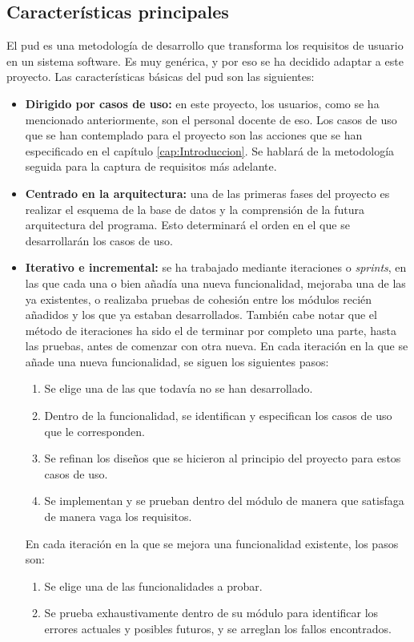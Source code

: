 \subsection{Características principales}
El \gls{pud} es una metodología de desarrollo que transforma los requisitos de usuario en un sistema software. Es muy genérica, y por eso se ha decidido adaptar a este proyecto.
Las características básicas del \gls{pud} son las siguientes:
\begin{itemize}
	\item \textbf{Dirigido por casos de uso:} en este proyecto, los usuarios, como se ha mencionado anteriormente, son el personal docente de \gls{eso}. Los casos de uso que se han contemplado para el proyecto son las acciones que se han especificado en el capítulo \ref{cap:Introduccion}. Se hablará de la metodología seguida para la captura de requisitos más adelante.
	\item \textbf{Centrado en la arquitectura:} una de las primeras fases del proyecto es realizar el esquema de la base de datos y la comprensión de la futura arquitectura del programa. Esto determinará el orden en el que se desarrollarán los casos de uso.
	\item \textbf{Iterativo e incremental:} se ha trabajado mediante iteraciones o \textit{sprints}, en las que cada una o bien añadía una nueva funcionalidad, mejoraba una de las ya existentes, o realizaba pruebas de cohesión entre los módulos recién añadidos y los que ya estaban desarrollados. También cabe notar que el método de iteraciones ha sido el de terminar por completo una parte, hasta las pruebas, antes de comenzar con otra nueva. En cada iteración en la que se añade una nueva funcionalidad, se siguen los siguientes pasos:
	\begin{enumerate}
		\item Se elige una de las que todavía no se han desarrollado.
		\item Dentro de la funcionalidad, se identifican y especifican los casos de uso que le corresponden.
		\item Se refinan los diseños que se hicieron al principio del proyecto para estos casos de uso.
		\item Se implementan y se prueban dentro del módulo de manera que satisfaga de manera vaga los requisitos.
	\end{enumerate}
	
	En cada iteración en la que se mejora una funcionalidad existente, los pasos son:
	\begin{enumerate}
		\item Se elige una de las funcionalidades a probar.
		\item Se prueba exhaustivamente dentro de su módulo para identificar los errores actuales y posibles futuros, y se arreglan los fallos encontrados.
	\end{enumerate}
	

\end{itemize}
